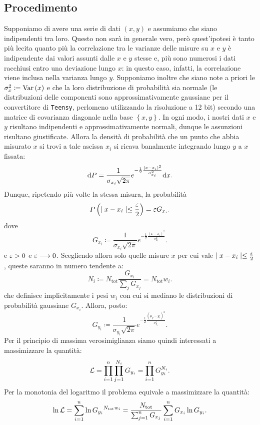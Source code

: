\documentclass{article}[a4paper, oneside, 11pt]
\begin{document}
\subsection{Procedimento}
Supponiamo di avere una serie di dati $(x, y)$ e assumiamo che siano
indipendenti tra loro. Questo non sarà in generale vero, però quest'ipotesi
è tanto più lecita quanto più la correlazione tra le varianze delle misure su
$x$ e $y$ è indipendente dai valori assunti dalle $x$ e $y$ stesse e, più
sono numerosi i dati racchiusi entro una deviazione lungo $x$: in questo caso,
infatti, la correlazione viene inclusa nella varianza lungo $y$.
Supponiamo inoltre che siano note a priori le $\sigma_x ^2 \coloneqq \text{Var}\left(x\right)$
e che la loro distribuzione di probabilità sia normale (le distribuzioni
delle componenti sono approssimativamente gaussiane per il convertitore
di \verb+Teensy+, perlomeno utilizzando la risoluzione a 12 bit) secondo una 
matrice
di covarianza diagonale nella base $\left\{x, y\right\}$.
In ogni modo, i nostri dati $x$ e $y$ risultano indipendenti e
approssimativamente normali, dunque le assunzioni risultano giustificate. 
Allora la densità di probabilità che un punto che abbia misurato $x$ si trovi
a tale ascissa $x_i$ si ricava banalmente integrando lungo $y$ a $x$ fissata:
\[
	\mathrm{d} P = \frac{1}{\sigma_{x_i} \sqrt{2\pi}}
	e^{-\frac{1}{2}{\frac{(x - x_i)^2}{\sigma_{x_i}^2}}} \mathrm{d} x
.\] 
Dunque, ripetendo più volte la stessa misura, la probabilità
\[
	P\left(\mid x - x_i \mid \leq \frac{\varepsilon}{2} \right) = \varepsilon G_{x_i} 
.\]
dove \[
	G_{x_i} \coloneqq \frac{1}{\sigma_{x_i} \sqrt{2\pi}}
	e^{-\frac{1}{2}{\frac{(x - x_i)^2}{\sigma_{x_i}^2}}}
.\] 
e $\varepsilon > 0$ e $\varepsilon \longrightarrow 0$. Scegliendo allora solo quelle misure $x$ per
cui vale $\mid x - x_i \mid \leq \frac{\varepsilon}{2}$, queste saranno in numero
tendente a:
\[
	N_i \coloneqq N_{\text{tot}} \frac{G_{x_i}}{\sum_j G_{x_j}} =
		N_{\text{tot}} w_i
.\] 
che definisce implicitamente i pesi $w_i$ con cui si mediano le distribuzioni
di probabilità gaussiane $G_{x_i}$.
Allora, posto:
\[
	G_{y_i} \coloneqq \frac{1}{\sigma_{y_i} \sqrt{2\pi}}
	e^{-\frac{1}{2}{\frac{(\mu_y - y_i)^2}{\sigma_{y_i}^2}}}
.\] 
Per il principio di massima verosimiglianza siamo quindi interessati a
massimizzare la quantità:
\[
	\mathcal L = \prod_{i=1}^{n} \prod_{j=1}^{N_i} G_{y_i} = 
	\prod_{i=1}^{n} G_{y_i}^{N_i}
.\] 
Per la monotonia del logaritmo il problema equivale a massimizzare la quantità:
\[
	\ln{\mathcal L} = \sum_{i=1}^{n}\ln{G_{y_i}}^{N_{\text{tot}}w_i} = 
	\frac{N_{\text{tot}}} {\sum_{j=1}^{n} G_{x_j}} 
	\sum_{i=1}^{n} G_{x_i} \ln{G_{y_i}}
.\] 
\end{document}
